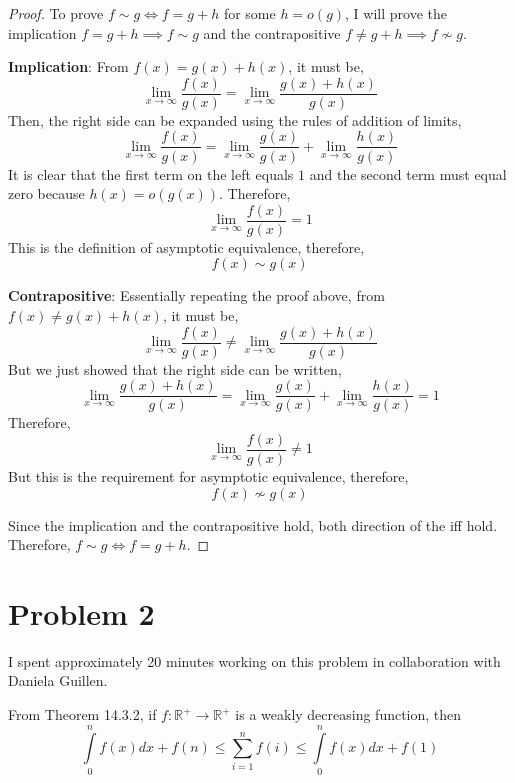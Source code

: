 \documentclass{article}
\begin{document}
\begin{proof}
  To prove $f \sim g \iff f = g + h$ for some $h = o(g)$, I will prove the
  implication $ f = g + h \implies f \sim g $ and the contrapositive $ f \neq g
  + h \implies f \not\sim g $.

  \bigbreak

  \textbf{Implication}: From $f(x) = g(x) + h(x)$, it must be,
  $$ \lim_{x \to \infty} \frac{f(x)}{g(x)} = \lim_{x \to \infty} \frac{g(x) +
  h(x)}{g(x)} $$
  Then, the right side can be expanded using the rules of addition of limits,
  $$ \lim_{x \to \infty} \frac{f(x)}{g(x)} = \lim_{x \to \infty}
  \frac{g(x)}{g(x)} + \lim_{x \to \infty} \frac{h(x)}{g(x)} $$
  It is clear that the first term on the left equals $1$ and the second term
  must equal zero because $h(x) = o(g(x))$. Therefore,
  $$ \lim_{x \to \infty} \frac{f(x)}{g(x)} = 1 $$
  This is the definition of asymptotic equivalence, therefore,
  $$ f(x) \sim g(x) $$

  \bigbreak

  \textbf{Contrapositive}: Essentially repeating the proof above, from $f(x)
  \neq g(x) + h(x)$, it must be,
  $$ \lim_{x \to \infty} \frac{f(x)}{g(x)} \neq \lim_{x \to \infty} \frac{g(x) +
  h(x)}{g(x)} $$
  But we just showed that the right side can be written,
  $$ \lim_{x \to \infty} \frac{g(x) + h(x)}{g(x)} = \lim_{x \to \infty}
  \frac{g(x)}{g(x)} + \lim_{x \to \infty} \frac{h(x)}{g(x)} = 1 $$
  Therefore,
  $$ \lim_{x \to \infty} \frac{f(x)}{g(x)} \neq 1 $$
  But this is the requirement for asymptotic equivalence, therefore,
  $$ f(x) \not\sim g(x) $$

  \bigbreak

  Since the implication and the contrapositive hold, both direction of the iff
  hold. Therefore, $f \sim g \iff f = g + h$.

\end{proof}

\break

\section*{Problem 2}

I spent approximately 20 minutes working on this problem in collaboration with
Daniela Guillen.

\bigbreak

From Theorem 14.3.2, if $f: \mathbb{R}^+ \rightarrow \mathbb{R}^+$ is a weakly
decreasing function, then
$$ \int\limits_0^n f(x) dx + f(n) \leq \sum\limits_{i=1}^{n} f(i) \leq
\int\limits_0^n f(x) dx + f(1) $$
\end{document}
